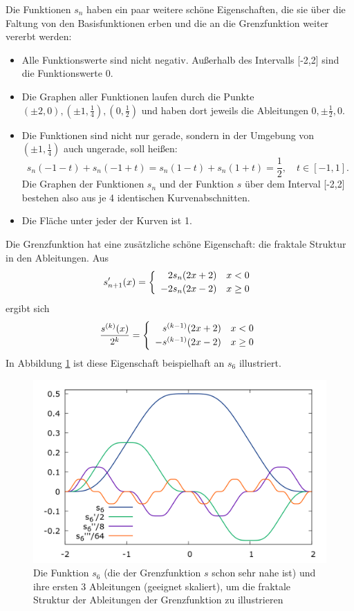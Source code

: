 \documentclass[german]{article}
\begin{document}
Die Funktionen $s_n$ haben ein paar weitere schöne Eigenschaften, die sie über die Faltung von den Basisfunktionen erben 
und die an die Grenzfunktion weiter vererbt werden:
\begin{itemize}
\item Alle Funktionswerte sind nicht negativ. Außerhalb des Intervalls [-2,2] sind die Funktionswerte 0.
\item Die Graphen aller Funktionen laufen durch die Punkte $(\pm 2,0), (\pm 1,\frac{1}{4}), (0,\frac{1}{2})$ 
      und haben dort jeweils die Ableitungen $0, \pm\frac{1}{2}, 0$.
\item Die Funktionen sind nicht nur gerade, sondern in der Umgebung von $(\pm 1,\frac{1}{4})$ auch ungerade, soll heißen:
      \[ s_n(-1-t) + s_n(-1+t) = s_n(1-t) + s_n(1+t) = \frac{1}{2}, \quad t \in [-1,1]. \] 
	  Die Graphen der Funktionen $s_n$ und der Funktion $s$ über dem Interval [-2,2] bestehen also aus je 4 identischen Kurvenabschnitten.
\item Die Fläche unter jeder der Kurven ist 1.
\end{itemize}

Die Grenzfunktion hat eine zusätzliche schöne Eigenschaft: die fraktale Struktur in den Ableitungen.
Aus
\[s'_{n+1}(x) = \left\{
	\begin{array}{ll}
		\hphantom{-}2s_n(2x+2) & x<0 \\[2pt]
		          - 2s_n(2x-2) & x\ge 0
	\end {array}
\right.
\]
ergibt sich
\[\frac{s^{(k)}(x)}{2^k} = \left\{
	\begin{array}{ll}
		\hphantom{-}s^{(k-1)}(2x+2) & x<0 \\[2pt]
		          - s^{(k-1)}(2x-2) & x\ge 0
	\end {array} 
\right.
\]
In Abbildung \ref{fig:der} ist diese Eigenschaft beispielhaft an $s_6$ illustriert.

\begin{figure}
  \includegraphics[width=\linewidth]{SchnablFunction_derivatives.png}
  \caption{Die Funktion $s_6$ (die der Grenzfunktion $s$ schon sehr nahe ist) und ihre ersten 3 Ableitungen (geeignet skaliert), 
  um die fraktale Struktur der Ableitungen der Grenzfunktion zu illustrieren}
  \label{fig:der}
\end{figure}
\end{document}
